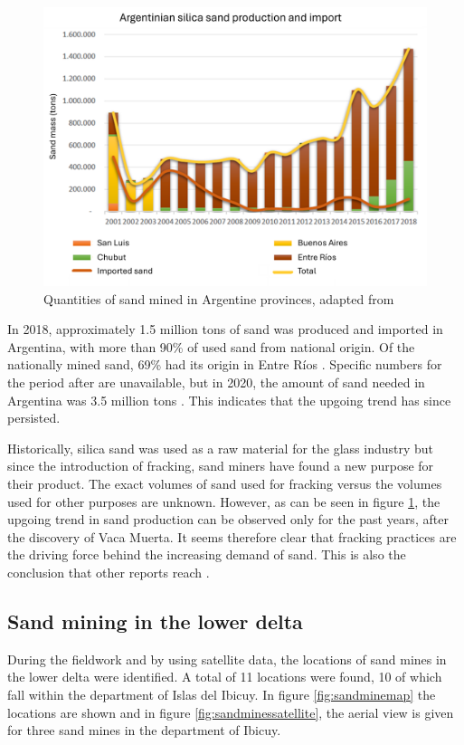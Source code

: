 \begin{figure}[H]
    \centering
    \includegraphics[width=1\linewidth]{figures/ch9/Sandgraphquantities.png}
    \caption{Quantities of sand mined in Argentine provinces, adapted from \cite{secretariadepoliticamineraArenasParaFracking2019}}
    \label{fig:sanddiagram}
\end{figure}

In 2018, approximately 1.5 million tons of sand was produced and imported in Argentina, with more than 90\% of used sand from national origin. Of the nationally mined sand, 69\% had its origin in Entre Ríos \autocite{secretariadepoliticamineraArenasParaFracking2019}. Specific numbers for the period after are unavailable, but in 2020, the amount of sand needed in Argentina was 3.5 million tons \autocite{novasImpactoAmbientalOculto2022}. This indicates that the upgoing trend has since persisted.

Historically, silica sand was used as a raw material for the glass industry but since the introduction of fracking, sand miners have found a new purpose for their product. The exact volumes of sand used for fracking versus the volumes used for other purposes are unknown. However, as can be seen in figure \ref{fig:sanddiagram}, the upgoing trend in sand production can be observed only for the past years, after the discovery of Vaca Muerta. It seems therefore clear that fracking practices are the driving force behind the increasing demand of sand. This is also the conclusion that other reports reach \autocite{secretariadepoliticamineraArenasParaFracking2019} \autocite{fogliaSedArena2023}.

\subsection{Sand mining in the lower delta}
During the fieldwork and by using satellite data, the locations of sand mines in the lower delta were identified. A total of 11 locations were found, 10 of which fall within the department of Islas del Ibicuy. In figure \ref{fig:sandminemap} the locations are shown and in figure \ref{fig:sandminessatellite}, the aerial view is given for three sand mines in the department of Ibicuy.


